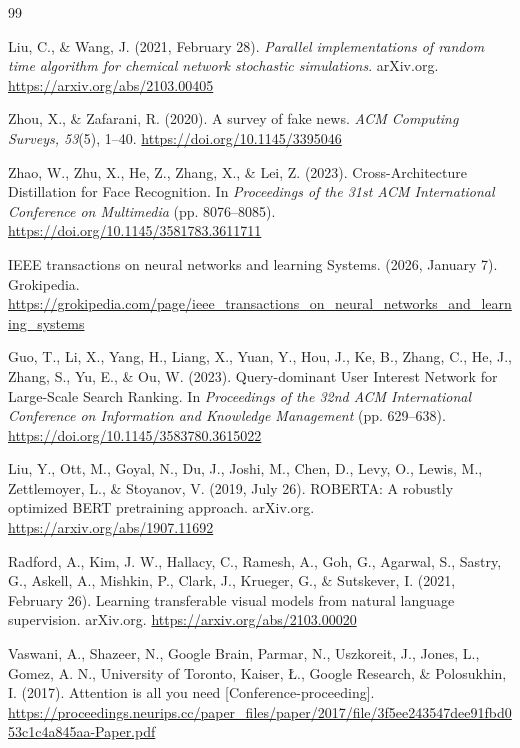 \begingroup
\footnotesize
\setlength{\itemsep}{0pt}
\setlength{\parskip}{0pt}

\begin{thebibliography}{99}

Liu, C., \& Wang, J. (2021, February 28). \textit{Parallel implementations of random time algorithm for chemical network stochastic simulations}. arXiv.org. \url{https://arxiv.org/abs/2103.00405}

Zhou, X., \& Zafarani, R. (2020). A survey of fake news. \textit{ACM Computing Surveys, 53}(5), 1--40. \url{https://doi.org/10.1145/3395046}

Zhao, W., Zhu, X., He, Z., Zhang, X., \& Lei, Z. (2023). Cross-Architecture Distillation for Face Recognition. In \textit{Proceedings of the 31st ACM International Conference on Multimedia} (pp. 8076--8085). \url{https://doi.org/10.1145/3581783.3611711}

IEEE transactions on neural networks and learning Systems. (2026, January 7). Grokipedia. \url{https://grokipedia.com/page/ieee_transactions_on_neural_networks_and_learning_systems}

Guo, T., Li, X., Yang, H., Liang, X., Yuan, Y., Hou, J., Ke, B., Zhang, C., He, J., Zhang, S., Yu, E., \& Ou, W. (2023). Query-dominant User Interest Network for Large-Scale Search Ranking. In \textit{Proceedings of the 32nd ACM International Conference on Information and Knowledge Management} (pp. 629--638). \url{https://doi.org/10.1145/3583780.3615022}

Liu, Y., Ott, M., Goyal, N., Du, J., Joshi, M., Chen, D., Levy, O., Lewis, M., Zettlemoyer, L., \& Stoyanov, V. (2019, July 26). ROBERTA: A robustly optimized BERT pretraining approach. arXiv.org. \url{https://arxiv.org/abs/1907.11692}

Radford, A., Kim, J. W., Hallacy, C., Ramesh, A., Goh, G., Agarwal, S., Sastry, G., Askell, A., Mishkin, P., Clark, J., Krueger, G., \& Sutskever, I. (2021, February 26). Learning transferable visual models from natural language supervision. arXiv.org. \url{https://arxiv.org/abs/2103.00020}

Vaswani, A., Shazeer, N., Google Brain, Parmar, N., Uszkoreit, J., Jones, L., Gomez, A. N., University of Toronto, Kaiser, \L{}., Google Research, \& Polosukhin, I. (2017). Attention is all you need [Conference-proceeding]. \url{https://proceedings.neurips.cc/paper_files/paper/2017/file/3f5ee243547dee91fbd053c1c4a845aa-Paper.pdf}


\end{thebibliography}
